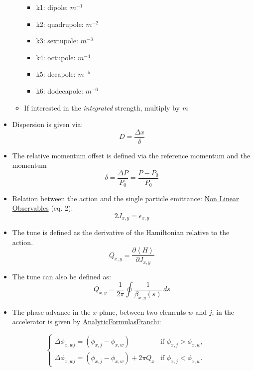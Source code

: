 \documentclass[openright,twoside,headsepline,bibliography=totoc]{scrbook}
\begin{document}
\begin{itemize}
\begin{itemize}
    \begin{itemize}
    \tightlist
    \item
      k1: dipole: \(m^{-1}\)
    \item
      k2: quadrupole: \(m^{-2}\)
    \item
      k3: sextupole: \(m^{-3}\)
    \item
      k4: octupole: \(m^{-4}\)
    \item
      k5: decapole: \(m^{-5}\)
    \item
      k6: dodecapole: \(m^{-6}\)
    \end{itemize}
  \item
    If interested in the \emph{integrated} strength, multiply by
    \emph{m}
  \end{itemize}
\item
  Dispersion is given via:
  \begin{equation}D = \frac{\Delta x}{\delta}\end{equation}
\item
  The relative momentum offset is defined via the reference momentum and
  the momentum
  \begin{equation}\delta = \frac{\Delta P}{P_0} = \frac{P - P_0}{P_0}\label{eq:dpp}\end{equation}
\item
  Relation between the action and the single particle emittance:
  \href{https://journals.aps.org/prab/pdf/10.1103/PhysRevSTAB.17.081002}{Non
  Linear Observables} (eq. 2):
  \begin{equation}2J_{x,y} = \epsilon_{x,y}\end{equation}
\item
  The tune is defined as the derivative of the Hamiltonian relative to
  the action.
  \begin{equation}Q_{x,y} = \frac{\partial \left< H \right>}{\partial J_{x,y}}\end{equation}
\item
  The tune can also be defined as:
  \begin{equation}Q_{x,y} = \frac{1}{2 \pi} \oint \frac{1}{\beta_{x,y}(s)} \,ds\end{equation}
\item
  The phase advance in the \(x\) plane, between two elements \(w\) and
  \(j\), in the accelerator is given by
  \href{https://arxiv.org/abs/1711.06589}{AnalyticFormulasFranchi}:
\end{itemize}

\begin{equation}
\begin{cases} 
  \Delta \phi_{x,wj} = \left(\phi_{x,j} - \phi_{x,w} \right)              & \mbox{if } \phi_{x,j} > \phi_{x,w}, \\
  \Delta \phi_{x,wj} = \left(\phi_{x,j} - \phi_{x,w} \right) + 2 \pi Q_x  & \mbox{if } \phi_{x,j} < \phi_{x,w}.
\end{cases}
\end{equation}
\end{document}
